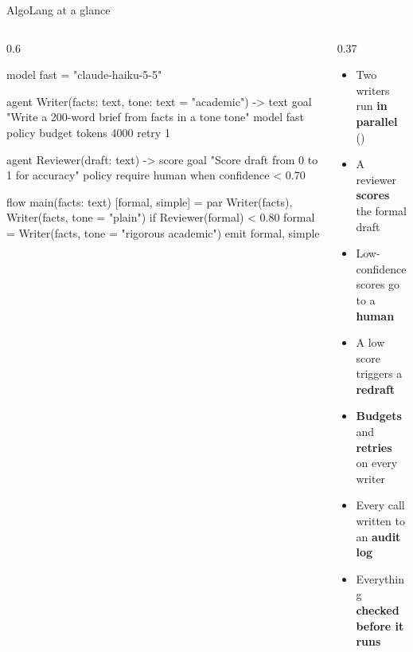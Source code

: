 \documentclass[aspectratio=169,11pt]{beamer}
\begin{document}
\begin{frame}[fragile]{AlgoLang at a glance}
\begin{columns}[T]
\begin{column}{0.6\textwidth}
\begin{algo}[listing options={language=AlgoLang,basicstyle=\ttfamily\fontsize{6.5}{7.6}\selectfont}]
model fast = "claude-haiku-5-5"

agent Writer(facts: text, tone: text = "academic") -> text {
    goal  "Write a 200-word brief from {facts} in a {tone} tone"
    model fast
    policy { budget tokens 4000  retry 1 }
}

agent Reviewer(draft: text) -> score {
    goal   "Score {draft} from 0 to 1 for accuracy"
    policy { require human when confidence < 0.70 }
}

flow main(facts: text) {
    [formal, simple] = par { Writer(facts), Writer(facts, tone = "plain") }
    if Reviewer(formal) < 0.80 {
        formal = Writer(facts, tone = "rigorous academic")
    }
    emit formal, simple
}
\end{algo}
\end{column}
\begin{column}{0.37\textwidth}
\footnotesize
\begin{itemize}
  \item Two writers run \textbf{in parallel} ()
  \item A reviewer \textbf{scores} the formal draft
  \item Low-confidence scores go to a \textbf{human}
  \item A low score triggers a \textbf{redraft}
  \item \textbf{Budgets} and \textbf{retries} on every writer
  \item Every call written to an \textbf{audit log}
  \item Everything \textbf{checked before it runs}
\end{itemize}
\end{column}
\end{columns}
\end{frame}

\end{document}
